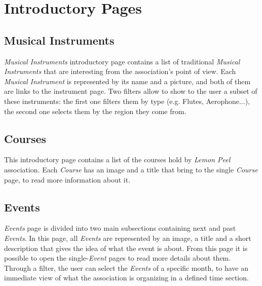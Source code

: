 \documentclass[../../DD.tex]{subfiles}
\begin{document}
\newpage
\section{Introductory Pages \label{sect:2.1}}
	\subsection{Musical Instruments}
		\textit{Musical Instruments} introductory page contains a list of traditional \textit{Musical Instruments} that are interesting from the association's point of view. Each \textit{Musical Instrument} is represented by its name and a picture, and both of them are links to the instrument page. Two filters allow to show to the user a subset of these instruments: the first one filters them by type (e.g. Flutes, Aerophone...), the second one selects them by the region they come from.
		\newline

	\newpage
	\subsection{Courses}
		This introductory page contains a list of the courses hold by \textit{Lemon Peel} association. Each \textit{Course} has an image and a title that bring to the single \textit{Course} page, to read more information about it.
		\newline

	\newpage
	\subsection{Events}
		\textit{Events} page is divided into two main subsections containing next and past \textit{Events}. In this page, all \textit{Events} are represented by an image, a title and a short description that gives the idea of what the event is about. From this page it is possible to open the single-\textit{Event} pages to read more details about them. Through a filter, the user can select the \textit{Events} of a specific month, to have an immediate view of what the association is organizing in a defined time section.
		\newline
\end{document}
